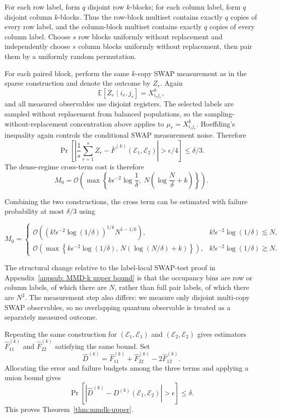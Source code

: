\documentclass[aps,prx,reprint,superscriptaddress,amsmath,amssymb,longbibliography,floatfix]{revtex4-2}
\newcommand{\Abs}[1]{\left\lvert #1\right\rvert}
\newcommand{\dsE}{\mathbb{E}}
\newcommand{\scE}{\mathcal{E}}
\newcommand{\scO}{\mathcal{O}}
\theoremstyle{plain}
\theoremstyle{definition}
\theoremstyle{remark}
\begin{document}
For each row label, form $q$ disjoint row $k$-blocks; for each column label, form $q$ disjoint column $k$-blocks. Thus the row-block multiset contains exactly $q$ copies of every row label, and the column-block multiset contains exactly $q$ copies of every column label. Choose $s$ row blocks uniformly without replacement and independently choose $s$ column blocks uniformly without replacement, then pair them by a uniformly random permutation.

For each paired block, perform the same $k$-copy SWAP measurement as in the sparse construction and denote the outcome by $Z_r$. Again
$$
\dsE[Z_r\mid i_r,j_r]=X_{i_rj_r}^k,
$$
and all measured observables use disjoint registers. The selected labels are sampled without replacement from balanced populations, so the sampling-without-replacement concentration above applies to $\mu_r=X_{i_rj_r}^k$. Hoeffding's inequality again controls the conditional SWAP measurement noise. Therefore
$$
\Pr\!\left[
\Abs{\frac1s\sum_{r=1}^s Z_r-\bar F^{(k)}(\scE_1,\scE_2)}>\epsilon/4
\right]\le \delta/3.
$$
The dense-regime cross-term cost is therefore
$$
M_0=\scO\!\left(
\max\left\{
k\epsilon^{-2}\log\frac1\delta,\;
N\left(\log\frac{N}{\delta}+k\right)
\right\}
\right).
$$

Combining the two constructions, the cross term can be estimated with failure probability at most $\delta/3$ using
\begin{widetext}
\begin{equation}
M_0=
\begin{cases}
\scO\!\left(\left(k!\epsilon^{-2}\log(1/\delta)\right)^{1/k}N^{1-1/k}\right),
& k!\epsilon^{-2}\log(1/\delta)\lesssim N,\\[1mm]
\scO\!\left(\max\left\{k\epsilon^{-2}\log(1/\delta),\,N\left(\log(N/\delta)+k\right)\right\}\right),
& k!\epsilon^{-2}\log(1/\delta)\gtrsim N.
\end{cases}
\label{eq:app-across-label-sample-regimes}
\end{equation}
\end{widetext}
The structural change relative to the label-local SWAP-test proof in Appendix~\ref{appsub: MMD-k upper bound} is that the occupancy bins are row or column labels, of which there are $N$, rather than full pair labels, of which there are $N^2$. The measurement step also differs: we measure only disjoint multi-copy SWAP observables, so no overlapping quantum observable is treated as a separately measured outcome.

Repeating the same construction for $(\scE_1,\scE_1)$ and $(\scE_2,\scE_2)$ gives estimators $\widehat F_{11}^{(k)}$ and $\widehat F_{22}^{(k)}$ satisfying the same bound. Set
\begin{equation}
\widehat D^{(k)}=\widehat F_{11}^{(k)}+\widehat F_{22}^{(k)}-2\widehat F_{12}^{(k)}.
\label{eq:app-across-label-mmd-estimator}
\end{equation}
Allocating the error and failure budgets among the three terms and applying a union bound gives
\begin{equation}
\Pr\!\left[
\Abs{\widehat D^{(k)}-D^{(k)}(\scE_1,\scE_2)}>\epsilon
\right]\le\delta.
\label{eq:app-across-label-mmd-accuracy}
\end{equation}
This proves Theorem~\ref{thm:mmdk-upper}.
\end{document}
